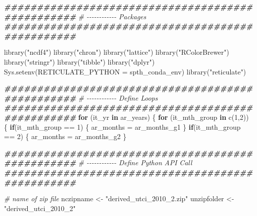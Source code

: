 \documentclass[
]{book}
\newenvironment{Shaded}{\begin{snugshade}}{\end{snugshade}}
\newcommand{\AttributeTok}[1]{\textcolor[rgb]{0.77,0.63,0.00}{#1}}
\newcommand{\CommentTok}[1]{\textcolor[rgb]{0.56,0.35,0.01}{\textit{#1}}}
\newcommand{\ControlFlowTok}[1]{\textcolor[rgb]{0.13,0.29,0.53}{\textbf{#1}}}
\newcommand{\DecValTok}[1]{\textcolor[rgb]{0.00,0.00,0.81}{#1}}
\newcommand{\DocumentationTok}[1]{\textcolor[rgb]{0.56,0.35,0.01}{\textbf{\textit{#1}}}}
\newcommand{\FunctionTok}[1]{\textcolor[rgb]{0.00,0.00,0.00}{#1}}
\newcommand{\NormalTok}[1]{#1}
\newcommand{\OtherTok}[1]{\textcolor[rgb]{0.56,0.35,0.01}{#1}}
\newcommand{\SpecialCharTok}[1]{\textcolor[rgb]{0.00,0.00,0.00}{#1}}
\newcommand{\StringTok}[1]{\textcolor[rgb]{0.31,0.60,0.02}{#1}}
\begin{document}
\begin{Shaded}
\begin{Highlighting}[]
\DocumentationTok{\#\#\#\#\#\#\#\#\#\#\#\#\#\#\#\#\#\#\#\#\#\#\#\#\#\#\#\#\#\#\#\#\#\#\#\#\#\#\#\#\#\#\#\#\#\#\#\#\#}
\CommentTok{\# {-}{-}{-}{-}{-}{-}{-}{-}{-}{-}{-}{-} Packages}
\DocumentationTok{\#\#\#\#\#\#\#\#\#\#\#\#\#\#\#\#\#\#\#\#\#\#\#\#\#\#\#\#\#\#\#\#\#\#\#\#\#\#\#\#\#\#\#\#\#\#\#\#\#}

\FunctionTok{library}\NormalTok{(}\StringTok{"ncdf4"}\NormalTok{)}
\FunctionTok{library}\NormalTok{(}\StringTok{"chron"}\NormalTok{)}
\FunctionTok{library}\NormalTok{(}\StringTok{"lattice"}\NormalTok{)}
\FunctionTok{library}\NormalTok{(}\StringTok{"RColorBrewer"}\NormalTok{)}
\FunctionTok{library}\NormalTok{(}\StringTok{"stringr"}\NormalTok{)}
\FunctionTok{library}\NormalTok{(}\StringTok{"tibble"}\NormalTok{)}
\FunctionTok{library}\NormalTok{(}\StringTok{"dplyr"}\NormalTok{)}
\FunctionTok{Sys.setenv}\NormalTok{(}\AttributeTok{RETICULATE\_PYTHON =}\NormalTok{ spth\_conda\_env)}
\FunctionTok{library}\NormalTok{(}\StringTok{"reticulate"}\NormalTok{)}

\DocumentationTok{\#\#\#\#\#\#\#\#\#\#\#\#\#\#\#\#\#\#\#\#\#\#\#\#\#\#\#\#\#\#\#\#\#\#\#\#\#\#\#\#\#\#\#\#\#\#\#\#\#}
\CommentTok{\# {-}{-}{-}{-}{-}{-}{-}{-}{-}{-}{-}{-} Define Loops}
\DocumentationTok{\#\#\#\#\#\#\#\#\#\#\#\#\#\#\#\#\#\#\#\#\#\#\#\#\#\#\#\#\#\#\#\#\#\#\#\#\#\#\#\#\#\#\#\#\#\#\#\#\#}
\ControlFlowTok{for}\NormalTok{ (it\_yr }\ControlFlowTok{in}\NormalTok{ ar\_years) \{}
  \ControlFlowTok{for}\NormalTok{ (it\_mth\_group }\ControlFlowTok{in} \FunctionTok{c}\NormalTok{(}\DecValTok{1}\NormalTok{,}\DecValTok{2}\NormalTok{)) \{}
    \ControlFlowTok{if}\NormalTok{(it\_mth\_group }\SpecialCharTok{==} \DecValTok{1}\NormalTok{) \{}
\NormalTok{      ar\_months }\OtherTok{=}\NormalTok{ ar\_months\_g1}
\NormalTok{    \}}
    \ControlFlowTok{if}\NormalTok{(it\_mth\_group }\SpecialCharTok{==} \DecValTok{2}\NormalTok{) \{}
\NormalTok{      ar\_months }\OtherTok{=}\NormalTok{ ar\_months\_g2}
\NormalTok{    \}}

    \DocumentationTok{\#\#\#\#\#\#\#\#\#\#\#\#\#\#\#\#\#\#\#\#\#\#\#\#\#\#\#\#\#\#\#\#\#\#\#\#\#\#\#\#\#\#\#\#\#\#\#\#\#}
    \CommentTok{\# {-}{-}{-}{-}{-}{-}{-}{-}{-}{-}{-}{-} Define Python API Call}
    \DocumentationTok{\#\#\#\#\#\#\#\#\#\#\#\#\#\#\#\#\#\#\#\#\#\#\#\#\#\#\#\#\#\#\#\#\#\#\#\#\#\#\#\#\#\#\#\#\#\#\#\#\#}

    \CommentTok{\# name of zip file}
\NormalTok{    nczipname }\OtherTok{\textless{}{-}} \StringTok{"derived\_utci\_2010\_2.zip"}
\NormalTok{    unzipfolder }\OtherTok{\textless{}{-}} \StringTok{"derived\_utci\_2010\_2"}


\end{Highlighting}
\end{Shaded}
\end{document}
